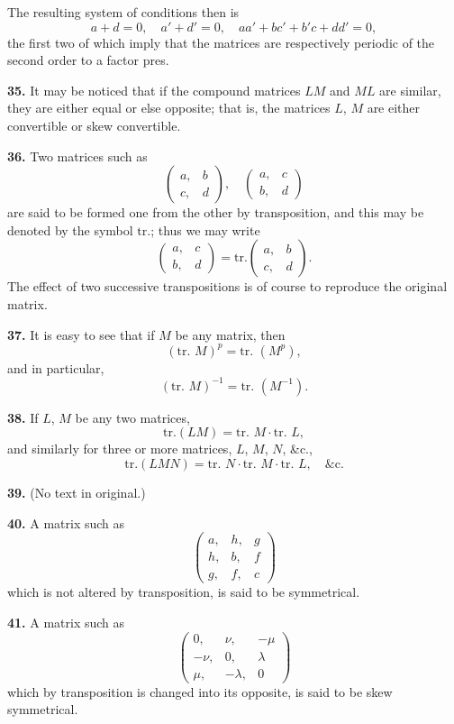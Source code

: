\documentclass[11pt,a4paper]{book}
\begin{document}
\begin{center}
The resulting system of conditions then is
\[
a+d=0,\quad a'+d'=0,\quad aa'+bc'+b'c+dd'=0,
\]
the first two of which imply that the matrices are respectively periodic of the second order to a factor pres.

\medskip
\noindent\textbf{35.} It may be noticed that if the compound matrices $LM$ and $ML$ are similar, they are either equal or else opposite; that is, the matrices $L$, $M$ are either convertible or skew convertible.

\medskip
\noindent\textbf{36.} Two matrices such as
\[
\begin{pmatrix} a, & b \\ c, & d \end{pmatrix},\quad
\begin{pmatrix} a, & c \\ b, & d \end{pmatrix}
\]
are said to be formed one from the other by transposition, and this may be denoted by the symbol $\text{tr.}$; thus we may write
\[
\begin{pmatrix} a, & c \\ b, & d \end{pmatrix} = \text{tr.} \begin{pmatrix} a, & b \\ c, & d \end{pmatrix}.
\]
The effect of two successive transpositions is of course to reproduce the original matrix.

\medskip
\noindent\textbf{37.} It is easy to see that if $M$ be any matrix, then
\[(\text{tr. }M)^p = \text{tr. }(M^p),\]
and in particular,
\[(\text{tr. }M)^{-1} = \text{tr. }(M^{-1}).\]

\medskip
\noindent\textbf{38.} If $L$, $M$ be any two matrices,
\[\text{tr.}(LM) = \text{tr. }M \cdot \text{tr. }L,\]
and similarly for three or more matrices, $L$, $M$, $N$, \&c.,
\[\text{tr.}(LMN) = \text{tr. }N \cdot \text{tr. }M \cdot \text{tr. }L, \quad \&\text{c.}\]

\medskip
\noindent\textbf{39.} (No text in original.)

\medskip
\noindent\textbf{40.} A matrix such as
\[
\begin{pmatrix} a, & h, & g \\ h, & b, & f \\ g, & f, & c \end{pmatrix}
\]
which is not altered by transposition, is said to be symmetrical.

\medskip
\noindent\textbf{41.} A matrix such as
\[
\begin{pmatrix} 0, & \nu, & -\mu \\ -\nu, & 0, & \lambda \\ \mu, & -\lambda, & 0 \end{pmatrix}
\]
which by transposition is changed into its opposite, is said to be skew symmetrical.


\end{center}
\end{document}
